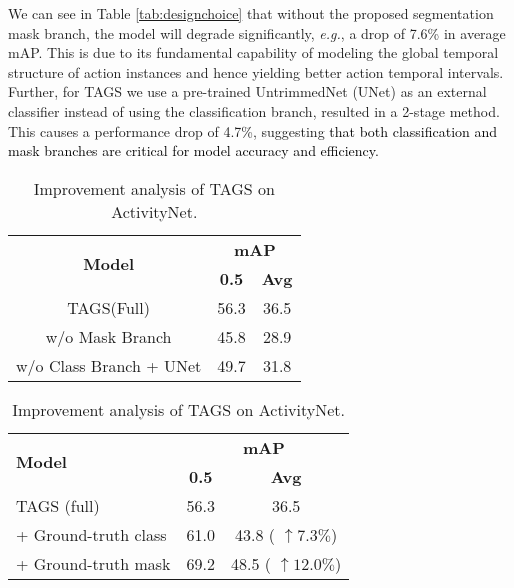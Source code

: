 \documentclass[runningheads]{llncs}
\newcommand{\eg}{\textit{e.g.}}
\newcommand{\shortmodelname}{TAGS}
\begin{document}
We can see in Table \ref{tab:designchoice} that without the proposed segmentation mask branch, the model will degrade significantly, \eg, a drop of 7.6\% in average mAP. This is due to its fundamental capability of modeling the global temporal structure of action instances and hence yielding better action temporal intervals. 
Further, for {\shortmodelname} we use a pre-trained UntrimmedNet (UNet) \cite{wang2017untrimmednets} as an external classifier instead of using the classification branch, resulted in a 2-stage method.
This causes a performance drop of 4.7\%, suggesting
\textcolor{black}{that both classification and mask branches 
are critical for model accuracy and efficiency.}

\begin{table}[h]
	\begin{minipage}{0.45\linewidth}
		\caption{Analysis of {\shortmodelname}'s two branches on ActivityNet.}
      \centering
      \label{tab:designchoice}
        \begin{tabular}{@{}c|c|c@{}}
\toprule
        \multirow{2}{*}{\textbf{Model}}  & \multicolumn{2}{c}{\textbf{mAP}} \\ \cmidrule(l){2-3} 
                                & \textbf{0.5}         & \textbf{Avg}        \\ \midrule
        {\shortmodelname}(Full)               &      56.3       &     36.5       \\ \midrule
        w/o Mask Branch         &      45.8       &    28.9        \\
        w/o Class Branch + UNet &     49.7        &     31.8       \\ \bottomrule
        \end{tabular}
	\end{minipage}\hfill
	\begin{minipage}{0.50\linewidth}
\caption{Improvement analysis of {\shortmodelname} on ActivityNet.}
        \begin{tabular}{l|c|c}
\toprule
        \multirow{2}{*}{\textbf{Model}} & \multicolumn{2}{c}{\textbf{mAP}} \\ \cmidrule(l){2-3} 
        & \textbf{0.5}    & \textbf{Avg}    \\ \midrule
        {\shortmodelname} (full) &     56.3  &     36.5           \\ \midrule
        + Ground-truth class &       61.0          &        43.8 ( $\uparrow 7.3\%$)         \\
        + Ground-truth mask   &        69.2         &          48.5 ( $\uparrow 12.0\%$)      \\ \bottomrule
        \end{tabular}
        \label{tab:imp_anal}
	\end{minipage}
\end{table}
\end{document}
